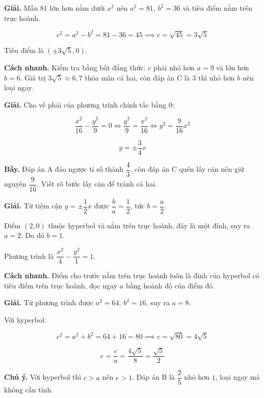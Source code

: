 \documentclass[11pt, a4paper]{article}
\begin{document}
\begin{dapan}[5 — Đáp án A]
\textbf{Giải.} Mẫu $81$ lớn hơn nằm dưới $x^2$ nên $a^2 = 81$, $b^2 = 36$ và tiêu điểm nằm trên trục hoành.

$$c^2 = a^2 - b^2 = 81 - 36 = 45 \implies c = \sqrt{45} = 3\sqrt{5}$$

Tiêu điểm là $(\pm 3\sqrt{5}, 0)$.

\textbf{Cách nhanh.} Kiểm tra bằng bất đẳng thức: $c$ phải nhỏ hơn $a = 9$ và lớn hơn $b = 6$. Giá trị $3\sqrt{5} \approx 6{,}7$ thỏa mãn cả hai, còn đáp án C là $3$ thì nhỏ hơn $b$ nên loại ngay.
\end{dapan}

\begin{dapan}[6 — Đáp án B]
\textbf{Giải.} Cho vế phải của phương trình chính tắc bằng $0$:

$$\frac{x^2}{16} - \frac{y^2}{9} = 0 \iff \frac{y^2}{9} = \frac{x^2}{16} \iff y^2 = \frac{9}{16}x^2$$

$$y = \pm\frac{3}{4}x$$

\textbf{Bẫy.} Đáp án A đảo ngược tỉ số thành $\dfrac{4}{3}$, còn đáp án C quên lấy căn nên giữ nguyên $\dfrac{9}{16}$. Viết rõ bước lấy căn để tránh cả hai.
\end{dapan}

\begin{dapan}[7 — Đáp án A]
\textbf{Giải.} Từ tiệm cận $y = \pm\dfrac{1}{2}x$ được $\dfrac{b}{a} = \dfrac{1}{2}$, tức $b = \dfrac{a}{2}$.

Điểm $(2, 0)$ thuộc hyperbol và nằm trên trục hoành, đây là một đỉnh, suy ra $a = 2$. Do đó $b = 1$.

Phương trình là $\dfrac{x^2}{4} - \dfrac{y^2}{1} = 1$.

\textbf{Cách nhanh.} Điểm cho trước nằm trên trục hoành luôn là đỉnh của hyperbol có tiêu điểm trên trục hoành, đọc ngay $a$ bằng hoành độ của điểm đó.
\end{dapan}

\begin{dapan}[8 — Đáp án A]
\textbf{Giải.} Từ phương trình được $a^2 = 64$, $b^2 = 16$, suy ra $a = 8$.

Với hyperbol:

$$c^2 = a^2 + b^2 = 64 + 16 = 80 \implies c = \sqrt{80} = 4\sqrt{5}$$

$$e = \frac{c}{a} = \frac{4\sqrt{5}}{8} = \frac{\sqrt{5}}{2}$$

\textbf{Chú ý.} Với hyperbol thì $c > a$ nên $e > 1$. Đáp án B là $\dfrac{2}{5}$ nhỏ hơn $1$, loại ngay mà không cần tính.
\end{dapan}
\end{document}
